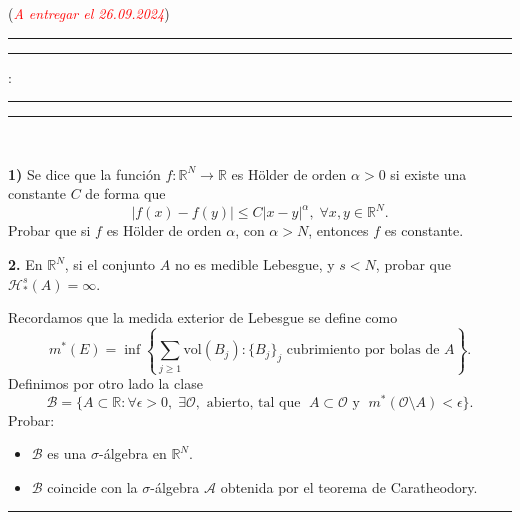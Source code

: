\documentclass[11pt,a4paper,draft]{article}
\newcommand{\red}{\textcolor{red}}
\begin{document}
\hfill (\red{\it A entregar el 26.09.2024})
\hrule\hrule
\vspace{1mm}


\vspace{1mm}

 : 
\vspace{2mm}

\hrule\hrule

\vspace{2mm}

\

{\bf 1)} Se dice que la funci\'on $f:\mathbb R^N \to \mathbb R$ es H\"older de orden $\alpha>0$ si existe una constante $C$ de forma que
$$
|f(x)-f(y)|\le C|x-y|^\alpha, \; \forall x,y \in \mathbb R^N. 
$$
Probar que si $f$ es H\"older de orden $\alpha$, con $\alpha>N$, entonces $f$ es constante. 

\vskip 5mm

 {\bf 2.}  En $\mathbb R^N$, si el conjunto $A$ no es medible Lebesgue, y  $s<N$, probar que  $\mathcal{H}^s_*(A)=\infty$.
 
\vskip 5mm

  Recordamos que la medida exterior de Lebesgue se define como
 \vskip -3mm
 $$
 m^*(E)=\inf\left\{\sum_{j\ge 1} \mbox{vol}(B_j): \{B_j\}_j \mbox{ cubrimiento por bolas de } A\right\}. 
 $$
  \vskip -3mm
  Definimos por otro lado la clase
  $$
  \mathcal{B}=\{A\subset \mathbb R: \forall \epsilon>0, \; \exists \mathcal{O},  \mbox{ abierto, tal que }\; A\subset \mathcal{O} \mbox{ y } \; m^*(\mathcal{O}\setminus A)<\epsilon\}. 
  $$
Probar: 
\begin{itemize}
\item  $\mathcal{B}$ es una $\sigma$-\'algebra en $\mathbb R^N$.
\item  $\mathcal{B}$ coincide con la $\sigma$-\'algebra $\mathcal A$ obtenida por el teorema de Caratheodory. 
\end{itemize}

\vskip 1mm
\hrule
\vskip 3mm

 
 
\end{document}

